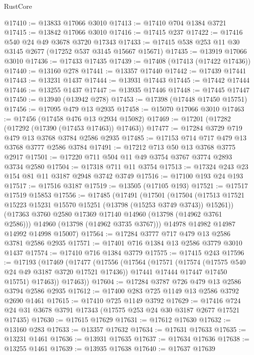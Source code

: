 \begin{lexlean}{RustCore}
\begin{coremodule}
@17410 := @13833 @17066 @3010
@17413 := @17410 @704 @1384 @3721
@17415 := @13842 @17066 @3010
@17416 := @17415 @237
@17422 := @17416 @540 @24 @49 @3678 @3720 @17343
@17433 := @17415 @538 @253 @11 @30 @3145 @2677 (@17252 @537 @3145 @15667 @15671)
@17435 := @13919 @17066 @3010
@17436 := @17433 @17435
@17439 := @17408 (@17413 (@17422 @17436))
@17440 := @13160 @278
@17441 := @13357 @17440
@17442 := @17439 @17441
@17443 := @13231 @1437
@17444 := @13931 @17443
@17445 := @17442 @17444
@17446 := @13255 @1437
@17447 := @13935 @17446
@17448 := @17445 @17447
@17450 := @13940 (@13942 @278)
@17453 := @17398 (@17448 @17450 @15751)
@17456 := @17095 @479 @13 @2935
@17458 := @15070 @17066 @3010
@17463 := @17456 (@17458 @476 @13 @2934 @15082)
@17469 := @17201 (@17282 (@17292 (@17390 (@17453 @17463)) @17463))
@17477 := @17284 @3729 @719 @479 @13 @3768 @3784 @2586 @2935
@17485 := @17153 @714 @717 @479 @13 @3768 @3777 @2586 @3784
@17491 := @17212 @713 @50 @13 @3768 @3775 @2917
@17501 := @17220 @711 @504 @11 @49 @3754 @3767 @3774 @2893 @3734 @2580
@17504 := @17318 @711 @11 @3754
@17513 := @17324 @243 @23 @154 @81 @11 @3187 @2948 @3742 @3749
@17516 := @17100 @193 @24 @193
@17517 := @17516 @3187
@17519 := @13505 (@17105 @193)
@17521 := @17517 @17519 @15853
@17556 := @17485
    (@17491
      (@17501
        (@17504 (@17513 @17521 @15223 @15231 @15570 @15251 (@13798 (@15253 @3749 @3743)) @15261))
        (@17363 @3760 @2580 @17369 @17140 @14960 (@13798 (@14962 @3761 @2586)))
        @14960
        (@13798 (@14962 @3735 @3767)))
      @14978
      @14982
      @14987
      @14992
      @14998
      @15007)
@17564 := @17284 @3777 @717 @479 @13 @2586 @3781 @2586 @2935
@17571 := @17401 @716 @1384 @13 @2586 @3779 @3010 @1437
@17574 := @17410 @716 @1384 @3779
@17575 := @17415 @243
@17596 := @17193
    (@17469
      (@17477
        (@17556
          (@17564
            (@17571
              (@17574 (@17575 @540 @24 @49 @3187 @3720 @17521 @17436))
              @17441
              @17444
              @17447
              @17450
              @15751)
            @17463))
        @17463))
@17604 := @17284 @3787 @726 @479 @13 @2586 @3794 @2586 @2935
@17612 := @17400 @283 @725 @1149 @13 @2586 @3792 @2690 @1461
@17615 := @17410 @725 @1149 @3792
@17629 := @17416 @724 @24 @31 @3678 @3791 @17343 (@17575 @253 @24 @30 @3187 @2677 @17521 @17435)
@17630 := @17615 @17629
@17631 := @17612 @17630
@17632 := @13160 @283
@17633 := @13357 @17632
@17634 := @17631 @17633
@17635 := @13231 @1461
@17636 := @13931 @17635
@17637 := @17634 @17636
@17638 := @13255 @1461
@17639 := @13935 @17638
@17640 := @17637 @17639

\end{coremodule}
\end{lexlean}
